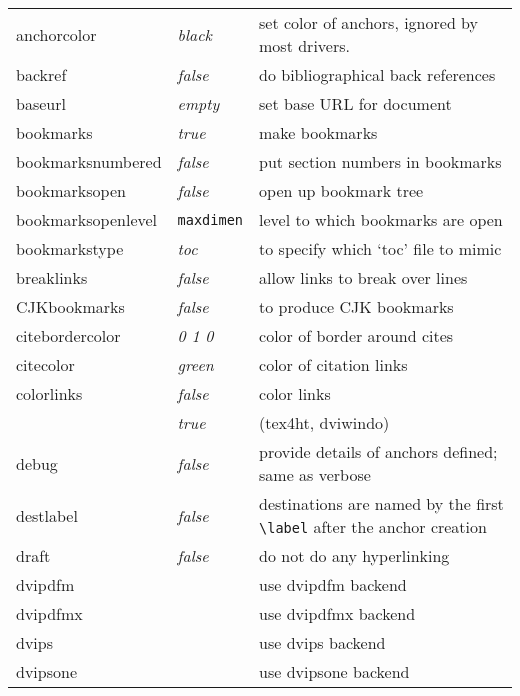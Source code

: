 \documentclass[pdftex]{article}
\newcommand{\bs}{\symbol{'134}}%
\newcommand{\ci}[1]{\texttt{\bs#1}}
\begin{document}
\begin{longtable}{@{}>{\ttfamily}llp{7cm}@{}}
anchorcolor        & \textit{black}         & set color of anchors, ignored by most drivers. \\
backref            & \textit{false}         & do bibliographical back references \\
baseurl            & \textit{empty}         & set base URL for document \\
bookmarks          & \textit{true}          & make bookmarks \\
bookmarksnumbered  & \textit{false}         & put section numbers in bookmarks \\
bookmarksopen      & \textit{false}         & open up bookmark tree \\
bookmarksopenlevel & \ttfamily\ci{maxdimen} & level to which bookmarks are open \\
bookmarkstype      & \textit{toc}           & to specify which `toc' file to mimic \\
breaklinks         & \textit{false}         & allow links to break over lines \\
CJKbookmarks       & \textit{false}         & to produce CJK bookmarks\\
citebordercolor    & \textit{0 1 0}         & color of border around cites \\
citecolor          & \textit{green}         & color of citation links \\
colorlinks         & \textit{false}         & color links \\
                   & \textit{true}          & (\textsf{tex4ht}, \textsf{dviwindo}) \\
debug              & \textit{false}         & provide details of anchors defined; same as verbose \\
destlabel          & \textit{false}         & destinations are named by the first \verb|\label| after the anchor creation \\
draft              & \textit{false}         & do not do any hyperlinking \\
dvipdfm            &                        & use \textsf{dvipdfm} backend \\
dvipdfmx           &                        & use \textsf{dvipdfmx} backend \\
dvips              &                        & use \textsf{dvips} backend \\
dvipsone           &                        & use \textsf{dvipsone} backend \\

\end{longtable}
\end{document}
